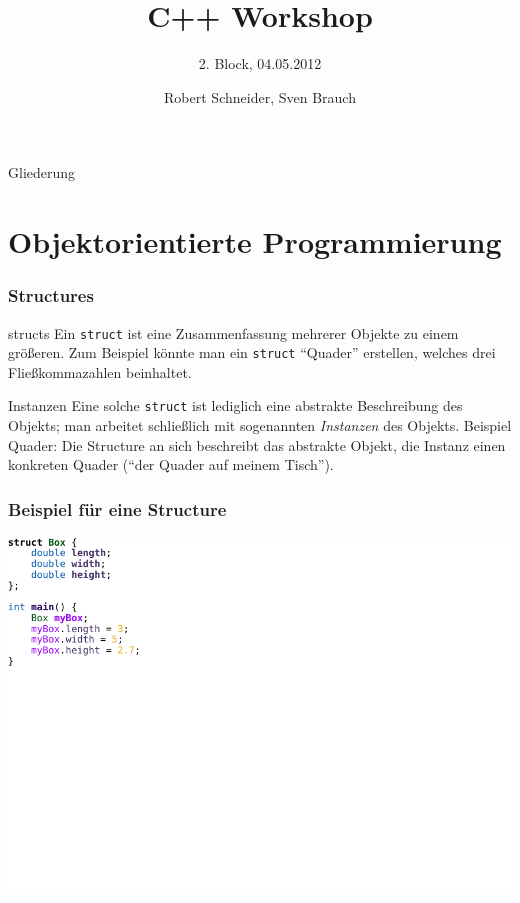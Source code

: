 \documentclass[18pt]{beamer}
\title[C++ Workshop]{C++ Workshop}
\subtitle{2. Block, 04.05.2012}
\author{Robert Schneider, Sven Brauch}
\institute{}
\begin{document}

\AtBeginSection[]{%
	\begin{frame}
		\tableofcontents[sectionstyle=show/hide,subsectionstyle=hide/show/hide]
	\end{frame}
	\addtocounter{framenumber}{-1}%
}

\begin{frame}
\titlepage
\end{frame}

\begin{frame}{Gliederung}
\tableofcontents
\end{frame}

\section{Objektorientierte Programmierung}
\begin{frame}
    \frametitle{Structures}
    \begin{block}{structs}
    Ein \texttt{struct} ist eine Zusammenfassung mehrerer Objekte zu einem größeren.
    Zum Beispiel könnte man ein \texttt{struct} "`Quader"' erstellen, welches drei Fließkommazahlen beinhaltet.
    \end{block}
    \begin{block}{Instanzen}
    Eine solche \texttt{struct} ist lediglich eine abstrakte Beschreibung des Objekts; man arbeitet schließlich mit sogenannten \emph{Instanzen} des Objekts. Beispiel Quader: Die Structure an sich beschreibt das abstrakte Objekt, die Instanz einen konkreten Quader ("`der Quader auf meinem Tisch"').
    \end{block}
\end{frame}
\begin{frame}
    \frametitle{Beispiel für eine Structure}
    \vspace{0.7cm}
    \includegraphics[width=15cm]{example_code/box.pdf}
\end{frame}
\end{document}
